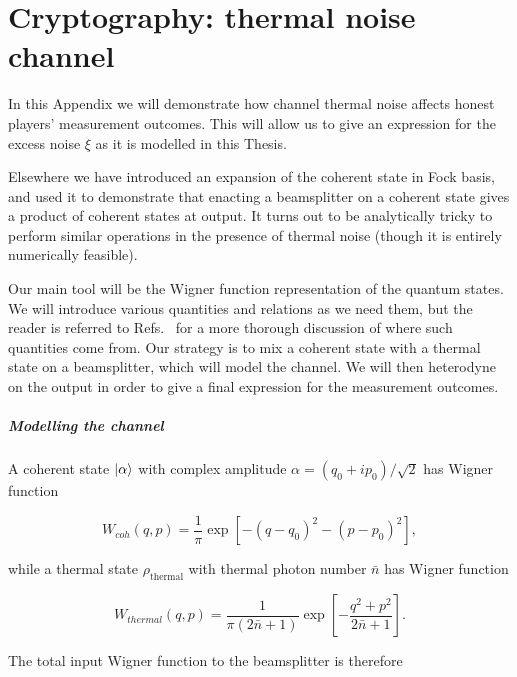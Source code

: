 \chapter{Cryptography: thermal noise channel}\label{appendix:noisy_perr}

In this Appendix we will demonstrate how channel thermal noise affects honest players' measurement outcomes. This will allow us to give an expression for the excess noise $\xi$ as it is modelled in this Thesis.

Elsewhere we have introduced an expansion of the coherent state in Fock basis, and used it to demonstrate that enacting a beamsplitter on a coherent state gives a product of coherent states at output. It turns out to be analytically tricky to perform similar operations in the presence of thermal noise (though it is entirely numerically feasible). 

Our main tool will be the Wigner function representation of the quantum states. We will introduce various quantities and relations as we need them, but the reader is referred to Refs.~\cite{Leonhardt2010, Serafini2019, brendon_book} for a more thorough discussion of where such quantities come from. Our strategy is to mix a coherent state with a thermal state on a beamsplitter, which will model the channel. We will then heterodyne on the output in order to give a final expression for the measurement outcomes.


\paragraph{Modelling the channel}

A coherent state $\ket{\alpha}$ with complex amplitude $\alpha = \left(q_0 + i p_0\right)/\sqrt{2}$ has Wigner function

\begin{equation}
W_{coh}\left(q, p\right) = \frac{1}{\pi} \exp\left[- \left(q - q_0\right)^2 - \left(p - p_0\right)^2 \right],
\end{equation}

while a thermal state $\rho_{\text{thermal}}$ with thermal photon number $\bar{n}$ has Wigner function

\begin{equation}
W_{thermal}\left(q, p\right) = \frac{1}{\pi\left(2 \bar{n} + 1 \right)}\exp\left[- \frac{q^2 + p^2}{2 \bar{n} + 1} \right].
\end{equation}

The total input Wigner function to the beamsplitter is therefore

